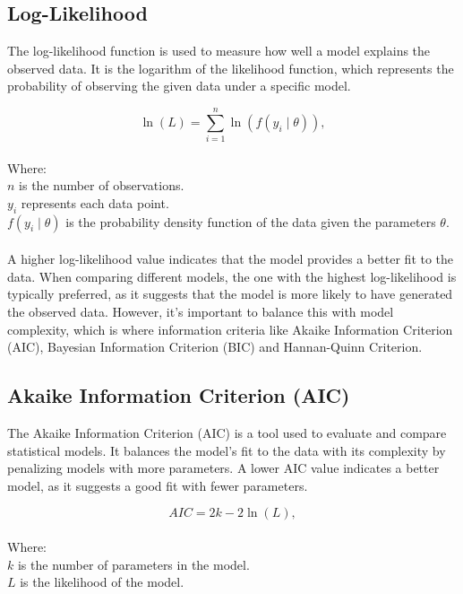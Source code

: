 \documentclass[doublespacing,12pt]{report}
\begin{document}
\subsection{Log-Likelihood}

The log-likelihood function is used to measure how well a model explains the observed data. It is the logarithm of the likelihood function, which represents the probability of observing the given data under a specific model.

\begin{equation}
\ln(L) = \sum_{i=1}^{n} \ln(f(y_i \mid \theta)),
\end{equation}\\
Where:\\
\vspace{0.1in}
     \(n\) is the number of observations. \\
\vspace{0.1in}
   \(y_i\) represents each data point. \\
\vspace{0.1in}
   \(f(y_i \mid \theta)\) is the probability density function of the data given the parameters \(\theta\). \\
\vspace{0.1in} \\
A higher log-likelihood value indicates that the model provides a better fit to the data. When comparing different models, the one with the highest log-likelihood is typically preferred, as it suggests that the model is more likely to have generated the observed data. However, it's important to balance this with model complexity, which is where information criteria like Akaike Information Criterion (AIC), Bayesian Information Criterion (BIC) and Hannan-Quinn Criterion.

\subsection{Akaike Information Criterion (AIC)}

The Akaike Information Criterion (AIC) is a tool used to evaluate and compare statistical models. It balances the model's fit to the data with its complexity by penalizing models with more parameters. A lower AIC value indicates a better model, as it suggests a good fit with fewer parameters.

\begin{equation}
AIC = 2k - 2\ln(L),
\end{equation}\\
Where:\\
\vspace{0.1in}
     \(k\) is the number of parameters in the model. \\
\vspace{0.1in}
     \(L\) is the likelihood of the model. \\
\end{document}
